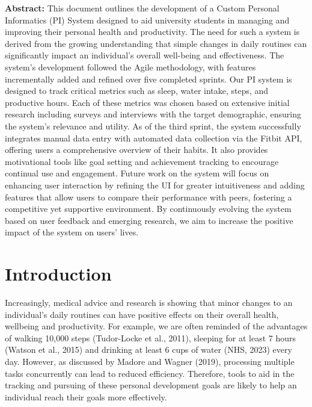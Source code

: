 \documentclass[11pt]{article}
\begin{document}
\begin{titlepage}
\begin{minipage}{0.8\textwidth}
        \normalsize\textbf{Abstract:} This document outlines the development of
        a Custom Personal Informatics (PI) System designed to aid university
        students in managing and improving their personal health and
        productivity. The need for such a system is derived from the growing
        understanding that simple changes in daily routines can significantly
        impact an individual's overall well-being and effectiveness. The
        system's development followed the Agile methodology, with features
        incrementally added and refined over five completed sprints. Our PI
        system is designed to track critical metrics such as sleep, water
        intake, steps, and productive hours. Each of these metrics was chosen
        based on extensive initial research including surveys and interviews
        with the target demographic, ensuring the system's relevance and
        utility. As of the third sprint, the system successfully integrates
        manual data entry with automated data collection via the Fitbit API,
        offering users a comprehensive overview of their habits. It also
        provides motivational tools like goal setting and achievement tracking
        to encourage continual use and engagement. Future work on the system
        will focus on enhancing user interaction by refining the UI for greater
        intuitiveness and adding features that allow users to compare their
        performance with peers, fostering a competitive yet supportive
        environment. By continuously evolving the system based on user feedback
        and emerging research, we aim to increase the positive impact of the
        system on users' lives.


    \end{minipage}

    \vfill
\end{titlepage}
\thispagestyle{fancy}

\newpage

\tableofcontents
\thispagestyle{empty}

\newpage

\setcounter{page}{1}


\section{Introduction}

Increasingly, medical advice and research is showing that minor changes to an
individual’s daily routines can have positive effects on their overall health,
wellbeing and productivity. For example, we are often reminded of the
advantages of walking 10,000 steps (Tudor-Locke et al., 2011), sleeping for at
least 7 hours (Watson et al., 2015) and drinking at least 6 cups of water (NHS,
2023) every day. However, as discussed by Madore and Wagner (2019), processing
multiple tasks concurrently can lead to reduced efficiency. Therefore, tools to
aid in the tracking and pursuing of these personal development goals are likely
to help an individual reach their goals more effectively.\par
\end{document}
